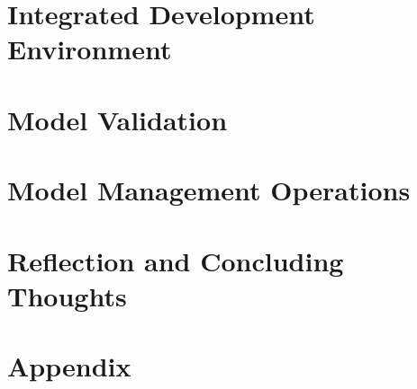\documentclass[11pt,fleqn]{article}
\begin{document}
\newpage{}

\section{Integrated Development Environment}
\label{sec:integrated-development-environment}

\newpage{}

\section{Model Validation}
\label{sec:model-validation}

\newpage{}

\section{Model Management Operations}
\label{sec:model-management-operations}

\newpage{}

\section{Reflection and Concluding Thoughts}
\label{sec:reflection-and-concluding-thoughts}

\newpage{}

\printbibliography[heading=bibintoc]

\newpage{}

\section*{Appendix}
\label{sec:appendix}
\end{document}
